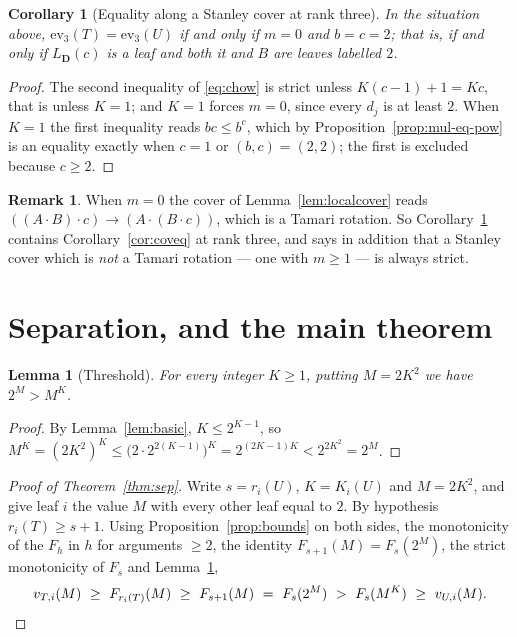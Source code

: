 \documentclass[11pt,a4paper]{article}
\theoremstyle{plain}
\newtheorem{lemma}[theorem]{Lemma}
\newtheorem{corollary}[theorem]{Corollary}
\theoremstyle{definition}
\newtheorem{remark}[theorem]{Remark}
\newcommand{\ev}{\mathrm{ev}}
\begin{document}
\begin{corollary}[Equality along a Stanley cover at rank three]\label{cor:chowcase}
In the situation above, $\ev_3(T)=\ev_3(U)$ if and only if $m=0$ and $b=c=2$; that is,
if and only if $L_{\mathbf D}(c)$ is a leaf and both it and $B$ are leaves labelled $2$.
\end{corollary}

\begin{proof}
The second inequality of \eqref{eq:chow} is strict unless $K(c-1)+1=Kc$, that is unless
$K=1$; and $K=1$ forces $m=0$, since every $d_j$ is at least $2$. When $K=1$ the first
inequality reads $bc\le b^{c}$, which by Proposition~\ref{prop:mul-eq-pow} is an equality
exactly when $c=1$ or $(b,c)=(2,2)$; the first is excluded because $c\ge2$.
\end{proof}

\begin{remark}\label{rem:m0tamari}
When $m=0$ the cover of Lemma~\ref{lem:localcover} reads
$((A\cdot B)\cdot c)\to(A\cdot(B\cdot c))$, which is a Tamari rotation. So
Corollary~\ref{cor:chowcase} contains Corollary~\ref{cor:coveq} at rank three, and says
in addition that a Stanley cover which is \emph{not} a Tamari rotation --- one with
$m\ge1$ --- is always strict.
\end{remark}

\section{Separation, and the main theorem}\label{sec:sep}

\begin{lemma}[Threshold]\label{lem:threshold}
For every integer $K\ge1$, putting $M=2K^{2}$ we have $2^{M}>M^{K}$.
\end{lemma}

\begin{proof}
By Lemma~\ref{lem:basic}, $K\le2^{K-1}$, so
$M^{K}=(2K^{2})^{K}\le\bigl(2\cdot2^{2(K-1)}\bigr)^{K}=2^{(2K-1)K}<2^{2K^{2}}=2^{M}$.
\end{proof}

\begin{proof}[Proof of Theorem~\ref{thm:sep}]
Write $s=r_i(U)$, $K=K_i(U)$ and $M=2K^{2}$, and give leaf $i$ the value $M$ with every
other leaf equal to $2$. By hypothesis $r_i(T)\ge s+1$. Using
Proposition~\ref{prop:bounds} on both sides, the monotonicity of the $F_h$ in $h$ for
arguments $\ge2$, the identity $F_{s+1}(M)=F_s(2^{M})$, the strict monotonicity of $F_s$
and Lemma~\ref{lem:threshold},
\[
  v_{T,i}(M)\ \ge\ F_{r_i(T)}(M)\ \ge\ F_{s+1}(M)\ =\ F_s(2^{M})
  \ >\ F_s(M^{K})\ \ge\ v_{U,i}(M). \qedhere
\]
\end{proof}
\end{document}
